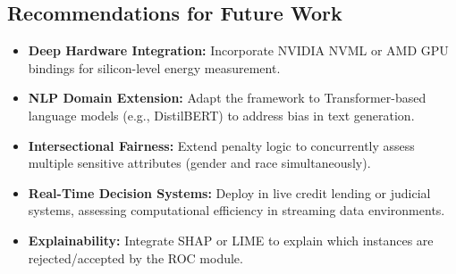 \documentclass[12pt,a4paper]{article}
\begin{document}
\subsection{Recommendations for Future Work}

\begin{itemize}
    \item \textbf{Deep Hardware Integration:} Incorporate NVIDIA NVML or AMD GPU bindings for silicon-level energy measurement.
    \item \textbf{NLP Domain Extension:} Adapt the framework to Transformer-based language models (e.g., DistilBERT) to address bias in text generation.
    \item \textbf{Intersectional Fairness:} Extend penalty logic to concurrently assess multiple sensitive attributes (gender and race simultaneously).
    \item \textbf{Real-Time Decision Systems:} Deploy in live credit lending or judicial systems, assessing computational efficiency in streaming data environments.
    \item \textbf{Explainability:} Integrate SHAP or LIME to explain which instances are rejected/accepted by the ROC module.
\end{itemize}



\newpage
\end{document}
